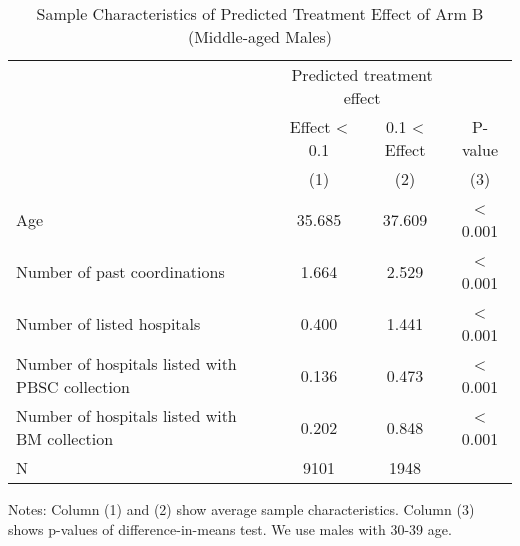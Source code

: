 \documentclass[
  11pt,
  a4paper
]{article}
\begin{document}
\begin{table}[H]

\caption{\label{tab:rcf-middle-male}Sample Characteristics of Predicted Treatment Effect of Arm B (Middle-aged Males)}
\centering
\fontsize{9}{11}\selectfont
\fontsize{9}{11}\selectfont
\begin{threeparttable}
\begin{tabular}[t]{lccc}
\toprule
\multicolumn{1}{c}{ } & \multicolumn{2}{c}{Predicted treatment effect} & \multicolumn{1}{c}{ } \\
\cmidrule(l{3pt}r{3pt}){2-3}
\multicolumn{1}{c}{ } & \multicolumn{1}{c}{Effect < 0.1} & \multicolumn{1}{c}{0.1 < Effect} & \multicolumn{1}{c}{P-value} \\
\cmidrule(l{3pt}r{3pt}){2-2} \cmidrule(l{3pt}r{3pt}){3-3} \cmidrule(l{3pt}r{3pt}){4-4}
 & (1) & (2) & (3)\\
\midrule
Age & 35.685 & 37.609 & < 0.001\\
Number of past coordinations & 1.664 & 2.529 & < 0.001\\
Number of listed hospitals & 0.400 & 1.441 & < 0.001\\
Number of hospitals listed with PBSC collection & 0.136 & 0.473 & < 0.001\\
Number of hospitals listed with BM collection & 0.202 & 0.848 & < 0.001\\
N & 9101 & 1948 & \\
\bottomrule
\end{tabular}
\begin{tablenotes}
\item Notes: Column (1) and (2) show average sample characteristics. Column (3) shows p-values of difference-in-means test. We use males with 30-39 age.
\end{tablenotes}
\end{threeparttable}
\end{table}
\end{document}
